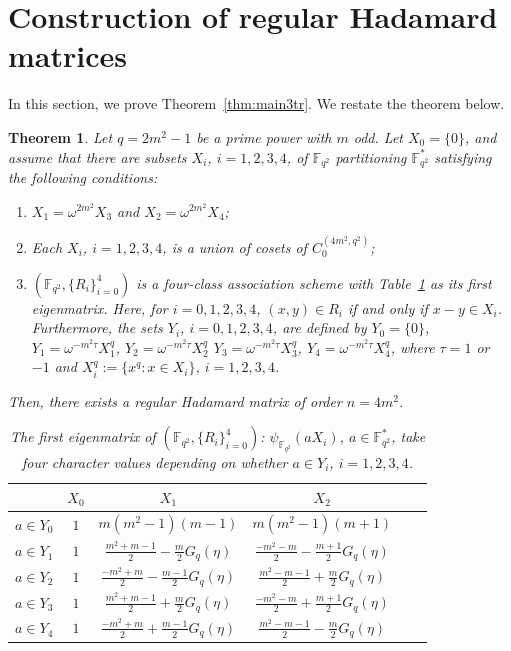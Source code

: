 \documentclass[10pt]{amsart}
\newtheorem{theo}{Theorem}[section]
\theoremstyle{definition}
\newcommand*\F{{\mathbb F}}
\begin{document}
\section{Construction of regular Hadamard matrices}\label{sec:const3}

In this section, we prove Theorem~\ref{thm:main3tr}. We restate the theorem below.

\begin{theo}\label{thm:main3}
Let $q=2m^2-1$ be a prime power with $m$ odd. Let $X_0=\{0\}$, and assume that there are subsets $X_i$, $i=1,2,3,4$, of $\F_{q^2}$ partitioning $\F_{q^2}^\ast$ satisfying the following conditions:
\begin{enumerate}
\item $X_1=\omega^{2m^2}X_3$ and $X_2=\omega^{2m^2}X_4$;
\item Each $X_i$, $i=1,2,3,4$, is a union of cosets of $C_0^{(4m^2,q^2)}$;
\item $(\F_{q^2},\{R_i\}_{i=0}^4)$ is a four-class association scheme with Table~\ref{tab_1} as its first eigenmatrix. Here, for $i=0,1,2,3,4$, $(x,y)\in R_i$ if and only if $x-y \in X_i$. Furthermore, the sets $Y_i$, $i=0,1,2,3,4$, are defined by $Y_0=\{0\}$, $Y_1=\omega^{-m^2\tau}X_1^q$, $Y_2=\omega^{-m^2\tau}X_2^q$ $Y_3=\omega^{-m^2\tau}X_3^q$, $Y_4=\omega^{-m^2\tau}X_4^q$, where $\tau=1$ or $-1$ and $X_i^q:=\{x^q:x\in X_i\}$, $i=1,2,3,4$.
\end{enumerate}
Then, there exists a regular Hadamard matrix of order $n=4m^2$.
\begin{table}[!h]
\begin{center}
\caption{\label{tab_1}
The first eigenmatrix of $(\F_{q^2},\{R_i\}_{i=0}^4)$: $\psi_{\F_{q^2}}(aX_i)$, $a\in \F_{q^2}^\ast$, take four character values depending on whether $a\in Y_i$, $i=1,2,3,4$. }
\begin{tabular}{|c||c|c|c|c|c|}\hline
&$X_0$&$X_1$& $X_2$ \\ \hline \hline $a\in Y_0$&$1$&$m(m^2-1)(m-1)$ &$m(m^2-1)(m+1)$ \\\hline $a\in Y_{1}$&$1$ &$\frac{m^2+m-1}{2}-\frac{m}{2}G_q(\eta)$ & $\frac{-m^2-m}{2}-\frac{m+1}{2}G_q(\eta)$ \\\hline $a\in Y_2$&$1$& $\frac{-m^2+m}{2}-\frac{m-1}{2}G_q(\eta)$& $\frac{m^2-m-1}{2}+\frac{m}{2}G_q(\eta)$ \\\hline $a\in Y_{3}$&$1$& $\frac{m^2+m-1}{2}+\frac{m}{2}G_q(\eta)$ & $\frac{-m^2-m}{2}+\frac{m+1}{2}G_q(\eta)$ \\\hline $a\in Y_4$&$1$ &$\frac{-m^2+m}{2}+\frac{m-1}{2}G_q(\eta)$ & $\frac{m^2-m-1}{2}-\frac{m}{2}G_q(\eta)$ \\\hline

\end{tabular}
\end{center}
\end{table}
\end{theo}
\end{document}
